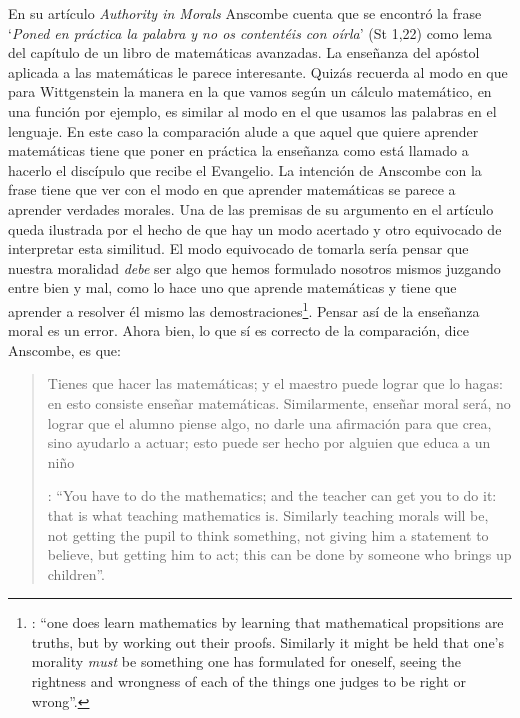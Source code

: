 En su artículo \emph{Authority in Morals} Anscombe cuenta que se encontró la frase \enquote*{\emph{Poned en práctica la palabra y no os contentéis con oírla}} (St 1,22) como lema del capítulo de un libro de matemáticas avanzadas. La enseñanza del apóstol aplicada a las matemáticas le parece interesante. Quizás recuerda al modo en que para Wittgenstein la manera en la que vamos según un cálculo matemático, en una función por ejemplo, es similar al modo en el que usamos las palabras en el lenguaje. En este caso la comparación alude a que aquel que quiere aprender matemáticas tiene que poner en práctica la enseñanza como está llamado a hacerlo el discípulo que recibe el Evangelio. La intención de Anscombe con la frase tiene que ver con el modo en que aprender matemáticas se parece a aprender verdades morales. Una de las premisas de su argumento en el artículo queda ilustrada por el hecho de que hay un modo acertado y otro equivocado de interpretar esta similitud. El modo equivocado de tomarla sería pensar que nuestra moralidad \emph{debe} ser algo que hemos formulado nosotros mismos juzgando entre bien y mal, como lo hace uno que aprende matemáticas y tiene que aprender a resolver él mismo las demostraciones\footnote{\cite[Cf.][45]{anscombe1981erp:am}: \enquote{one does learn mathematics by learning that mathematical propsitions are truths, but by working out their proofs. Similarly it might be held that one's morality \emph{must} be something one has formulated for oneself, seeing the rightness and wrongness of each of the things one judges to be right or wrong}.}. Pensar así de la enseñanza moral es un error. Ahora bien, lo que sí es correcto de la comparación, dice Anscombe, es que: \blockquote[{\Cite[47]{anscombe1981erp:am}}: \enquote{You have to do the mathematics; and the teacher can get you to do it: that is what teaching mathematics is. Similarly teaching morals will be, not getting the pupil to think something, not giving him a statement to believe, but getting him to act; this can be done by someone who brings up children}.]{Tienes que hacer las matemáticas; y el maestro puede lograr que lo hagas: en esto consiste enseñar matemáticas. Similarmente, enseñar moral será, no lograr que el alumno piense algo, no darle una afirmación para que crea, sino ayudarlo a actuar; esto puede ser hecho por alguien que educa a un niño}.

